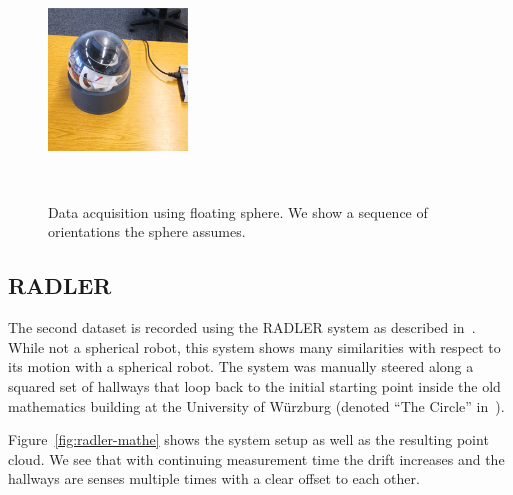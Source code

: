 \begin{figure}
\begin{minipage}[c]{0.5\textwidth}
		\includegraphics[width=0.33\textwidth]{./images/sphere-frame-6.eps}\hfill
	\end{minipage}\\
	\caption{Data acquisition using floating sphere. We show a sequence of orientations the sphere assumes.}
	\label{fig:float-sat-sphere}
\end{figure}

\subsection{RADLER}

The second dataset is recorded using the RADLER system as described in~\cite{Borrmann2020-RADLER}.
While not a spherical robot, this system shows many similarities with respect to its motion with a spherical robot.
The system was manually steered along a squared set of hallways that loop back to the initial starting point inside the old mathematics building at the University of Würzburg (denoted ``The Circle'' in~\cite{Borrmann2020-RADLER}).

Figure~\ref{fig:radler-mathe} shows the system setup as well as the resulting point cloud.
We see that with continuing measurement time the drift increases and the hallways are senses multiple times with a clear offset to each other. 

